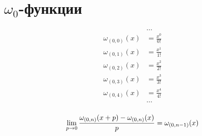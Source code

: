 
\section{$\omega_0$-функции}

\begin{equation*}\begin{aligned}
&\ldots \\
\omega_{(0,0)}(x) &= \frac{x^0}{0!} \\
\omega_{(0,1)}(x) &= \frac{x^1}{1!} \\
\omega_{(0,2)}(x) &= \frac{x^2}{2!} \\
\omega_{(0,3)}(x) &= \frac{x^3}{3!} \\
\omega_{(0,4)}(x) &= \frac{x^4}{4!} \\
&\ldots \\
\end{aligned}\end{equation*}

\begin{equation*}
\lim_{p \to 0} \frac{\omega_{(0, n)}(x + p) - \omega_{(0, n)}(x)}{p} = \omega_{(0, n - 1)}(x) \\
\end{equation*}
